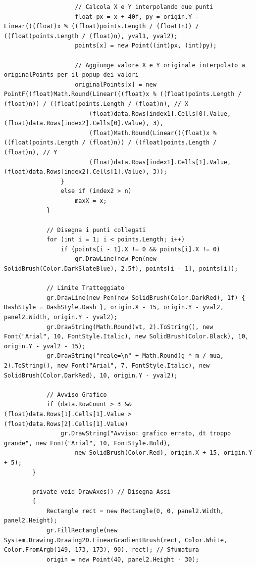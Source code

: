 \documentclass[11pt]{article} %
\begin{document}
\begin{lstlisting}
                    // Calcola X e Y interpolando due punti
                    float px = x + 40f, py = origin.Y - Linear(((float)x % ((float)points.Length / (float)n)) / ((float)points.Length / (float)n), yval1, yval2);
                    points[x] = new Point((int)px, (int)py);

                    // Aggiunge valore X e Y originale interpolato a originalPoints per il popup dei valori
                    originalPoints[x] = new PointF((float)Math.Round(Linear(((float)x % ((float)points.Length / (float)n)) / ((float)points.Length / (float)n), // X
                        (float)data.Rows[index1].Cells[0].Value, (float)data.Rows[index2].Cells[0].Value), 3),
                        (float)Math.Round(Linear(((float)x % ((float)points.Length / (float)n)) / ((float)points.Length / (float)n), // Y
                        (float)data.Rows[index1].Cells[1].Value, (float)data.Rows[index2].Cells[1].Value), 3));
                }
                else if (index2 > n)
                    maxX = x;
            }

            // Disegna i punti collegati
            for (int i = 1; i < points.Length; i++)
                if (points[i - 1].X != 0 && points[i].X != 0)
                    gr.DrawLine(new Pen(new SolidBrush(Color.DarkSlateBlue), 2.5f), points[i - 1], points[i]);

            // Limite Tratteggiato
            gr.DrawLine(new Pen(new SolidBrush(Color.DarkRed), 1f) { DashStyle = DashStyle.Dash }, origin.X - 15, origin.Y - yval2, panel2.Width, origin.Y - yval2);
            gr.DrawString(Math.Round(vt, 2).ToString(), new Font("Arial", 10, FontStyle.Italic), new SolidBrush(Color.Black), 10, origin.Y - yval2 - 15);
            gr.DrawString("reale=\n" + Math.Round(g * m / mua, 2).ToString(), new Font("Arial", 7, FontStyle.Italic), new SolidBrush(Color.DarkRed), 10, origin.Y - yval2);

            // Avviso Grafico
            if (data.RowCount > 3 && (float)data.Rows[1].Cells[1].Value > (float)data.Rows[2].Cells[1].Value)
                gr.DrawString("Avviso: grafico errato, dt troppo grande", new Font("Arial", 10, FontStyle.Bold),
                    new SolidBrush(Color.Red), origin.X + 15, origin.Y + 5);
        }

        private void DrawAxes() // Disegna Assi
        {
            Rectangle rect = new Rectangle(0, 0, panel2.Width, panel2.Height);
            gr.FillRectangle(new System.Drawing.Drawing2D.LinearGradientBrush(rect, Color.White, Color.FromArgb(149, 173, 173), 90), rect); // Sfumatura
            origin = new Point(40, panel2.Height - 30);


\end{lstlisting}
\end{document}
